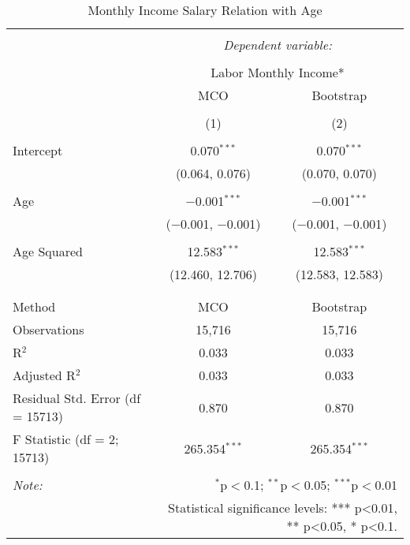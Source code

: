 
\begin{table}[!htbp] \centering 
  \caption{Monthly Income Salary Relation with Age} 
  \label{} 
\begin{tabular}{@{\extracolsep{5pt}}lcc} 
\\[-1.8ex]\hline 
\hline \\[-1.8ex] 
 & \multicolumn{2}{c}{\textit{Dependent variable:}} \\ 
\cline{2-3} 
\\[-1.8ex] & \multicolumn{2}{c}{Labor Monthly Income*} \\ 
 & MCO & Bootstrap \\ 
\\[-1.8ex] & (1) & (2)\\ 
\hline \\[-1.8ex] 
 Intercept & 0.070$^{***}$ & 0.070$^{***}$ \\ 
  & (0.064, 0.076) & (0.070, 0.070) \\ 
  & & \\ 
 Age & $-$0.001$^{***}$ & $-$0.001$^{***}$ \\ 
  & ($-$0.001, $-$0.001) & ($-$0.001, $-$0.001) \\ 
  & & \\ 
 Age Squared & 12.583$^{***}$ & 12.583$^{***}$ \\ 
  & (12.460, 12.706) & (12.583, 12.583) \\ 
  & & \\ 
\hline \\[-1.8ex] 
Method & MCO & Bootstrap \\ 
Observations & 15,716 & 15,716 \\ 
R$^{2}$ & 0.033 & 0.033 \\ 
Adjusted R$^{2}$ & 0.033 & 0.033 \\ 
Residual Std. Error (df = 15713) & 0.870 & 0.870 \\ 
F Statistic (df = 2; 15713) & 265.354$^{***}$ & 265.354$^{***}$ \\ 
\hline 
\hline \\[-1.8ex] 
\textit{Note:}  & \multicolumn{2}{r}{$^{*}$p$<$0.1; $^{**}$p$<$0.05; $^{***}$p$<$0.01} \\ 
 & \multicolumn{2}{r}{Statistical significance levels: *** p<0.01, ** p<0.05, * p<0.1.} \\ 
\end{tabular} 
\end{table} 
